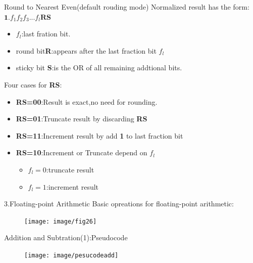 \documentclass[11pt]{beamer}
\begin{document}
\begin{frame}[t]{Round to Nearest Even(default rouding mode) }
Normalized result has the form:$\textbf{1.}f_1f_2f_3...f_l\textbf{RS}$
\begin{itemize}
\item $f_l$:last fration bit.
\item round bit\textbf{R}:appears after the last fraction bit $f_l$
\item sticky bit \textbf{S}:is the OR of all remaining addtional bits.
\end{itemize}
Four cases for \textbf{RS}:
\begin{itemize}
\item \textbf{RS=00}:Result is exact,no need for rounding.
\item \textbf{RS=01}:Truncate result by discarding \textbf{RS}
\item \textbf{RS=11}:Increment result by add \textbf{1} to last fraction bit
\item \textbf{RS=10}:Increment or Truncate depend on \textbf{$f_l$}\\
      \begin{itemize}
      \item \textbf{$f_l=0$}:truncate result
      \item \textbf{$f_l=1$}:increment result
      \end{itemize}
\end{itemize}
\end{frame}
\begin{frame}[t]{3.Floating-point Arithmetic}
Basic opreations for floating-point arithmetic:
\begin{center}
    \begin{figure}[htp]
    \begin{center}
     \texttt{[image: image/fig26]}
    \end{center}
    \label{reffig26}
    \end{figure}
\end{center}
\end{frame}
\begin{frame}[t]{Addition and Subtration(1):Pseudocode}
    \begin{figure}[htp]
    \begin{center}
     \texttt{[image: image/pesucodeadd]}
    \end{center}
    \label{refpesucodeadd}
    \end{figure}
\end{frame}
\end{document}
